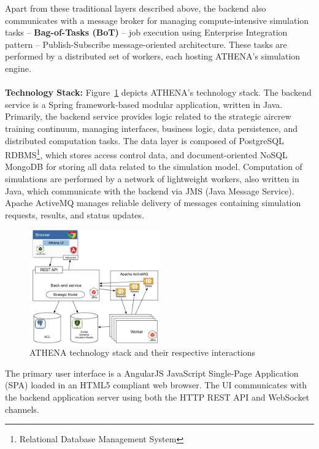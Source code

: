 Apart from these traditional layers described above, the backend also communicates with a message broker for managing compute-intensive simulation tasks -- \textbf{Bag-of-Tasks (BoT)} -- job execution using Enterprise Integration pattern -- Publish-Subscribe message-oriented architecture. These tasks are performed by a distributed set of workers, each hosting ATHENA's simulation engine.
\\
\\
\textbf{Technology Stack:} \quad Figure~\ref{fig:techStack} depicts ATHENA's technology stack. The backend service is a Spring framework-based modular application, written in Java. Primarily, the backend service provides logic related to the strategic aircrew training continuum, managing interfaces, business logic, data persistence, and distributed computation tasks. The data layer is composed of PostgreSQL RDBMS\footnote{Relational Database Management System}, which stores access control data, and document-oriented NoSQL MongoDB for storing all data related to the simulation model. Computation of simulations are performed by a network of lightweight workers, also written in Java, which communicate with the backend via JMS (Java Message Service). Apache ActiveMQ manages reliable delivery of messages containing simulation requests, results, and status updates. 

\begin{figure}
\centering
\includegraphics[width=0.5\textwidth]{Figures/ATHENA_tech_stack}
\decoRule
\caption[ATHENA Technology Stack]{ATHENA technology stack and their respective interactions}
\label{fig:techStack}
\end{figure}

The primary user interface is a AngularJS JavaScript Single-Page Application (SPA) loaded in an HTML5 compliant web browser. The UI communicates with the backend application server using both the HTTP REST API and WebSocket channels.

